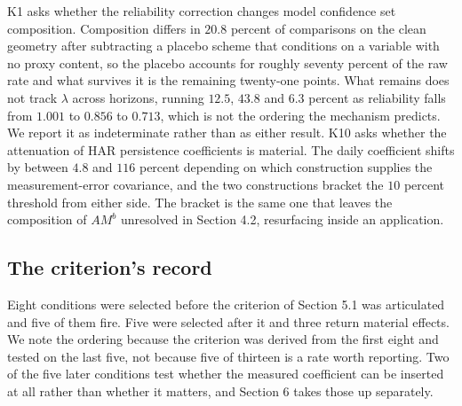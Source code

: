 K1 asks whether the reliability correction changes model confidence set
composition. Composition differs in $20.8$ percent of comparisons on the clean %
geometry after subtracting a placebo scheme that conditions on a variable with no
proxy content, so the placebo accounts for roughly seventy percent of the raw rate
and what survives it is the remaining twenty-one points. What remains %
does not track $\lambda$ across horizons, running $12.5$, $43.8$ and $6.3$ percent %
as reliability falls from $1.001$ to $0.856$ to $0.713$, which is not the ordering %
the mechanism predicts. We report it as indeterminate rather than as either
result. K10 asks whether the attenuation of HAR persistence coefficients is
material. The daily coefficient shifts by between $4.8$ and $116$ percent
depending on which construction supplies the measurement-error covariance, and %
the two constructions bracket the $10$ percent threshold from either side. The
bracket is the same one that leaves the composition of $A M^{b}$ unresolved in
Section 4.2, resurfacing inside an application.

\subsection{The criterion's record}

Eight conditions were selected before the criterion of Section 5.1 was
articulated and five of them fire. Five were selected after it and three return %
material effects. We note the ordering because the criterion was derived from the
first eight and tested on the last five, not because five of thirteen is a rate
worth reporting. Two of the five later conditions test whether the measured
coefficient can be inserted at all rather than whether it matters, and Section 6
takes those up separately.

